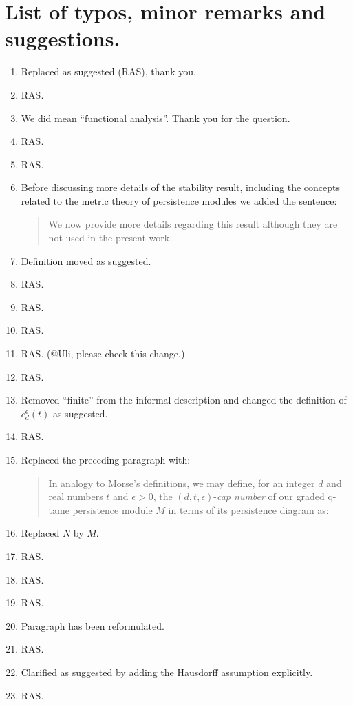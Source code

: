 \documentclass{article}
\begin{document}
	\section{List of typos, minor remarks and suggestions.}
	\begin{enumerate}
		\item Replaced as suggested (RAS), thank you.
		\item RAS.
		\item We did mean ``functional analysis''. Thank you for the question.
		\item RAS.
		\item RAS.
		\item Before discussing more details of the stability result, including the concepts related to the metric theory of persistence modules we added the sentence:
		\begin{quote}
			We now provide more details regarding this result although they are not used in the present work.
		\end{quote}
		\item Definition moved as suggested.
		\item RAS.
		\item RAS.
		\item RAS.
		\item RAS. (@Uli, please check this change.)
		\item RAS.
		\item Removed ``finite'' from the informal description and changed the definition of $c_d^{\epsilon}(t)$ as suggested.
		\item RAS.
		\item Replaced the preceding paragraph with:
		\begin{quote}
			In analogy to Morse's definitions, we may define, for an integer $d$ and real numbers $t$ and $\epsilon > 0$, the $(d, t, \epsilon)$-\emph{cap number} of our graded q-tame persistence module $M$ in terms of its persistence diagram as:
		\end{quote}
		\item Replaced $N$ by $M$.
		\item RAS.
		\item RAS.
		\item RAS.
		\item Paragraph has been reformulated.
		\item RAS.
		\item Clarified as suggested by adding the Hausdorff assumption explicitly.
		\item RAS.

\end{enumerate}
\end{document}

